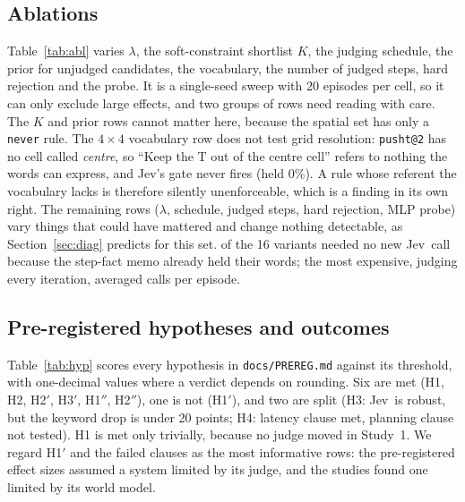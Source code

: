 \documentclass[11pt]{article}
\newcommand{\jev}{Jev}
\newcommand{\gentable}[1]{{\small\begin{adjustbox}{max width=\linewidth}\end{adjustbox}}}
\begin{document}
\subsection{Ablations}
\begin{table}[t]\centering\caption{Exploratory ablations (\jev, spatial set, Study~1 starts, seed 0,  episodes each; 95\% bootstrap intervals). $\dagger$: inert by construction on this set, which has no soft constraint. Each such row is identical to the same run without the change (the $K$ and prior rows to one another, $K=32,\lambda=4$ to $\lambda=4$); they are kept because they were pre-registered.}\label{tab:abl}
\gentable{figures/table_ablations.tex}
\end{table}
Table~\ref{tab:abl} varies $\lambda$, the soft-constraint shortlist $K$, the judging schedule, the prior for unjudged candidates, the vocabulary, the number of judged steps, hard rejection and the probe. It is a single-seed sweep with 20 episodes per cell, so it can only exclude large effects, and two groups of rows need reading with care. The $K$ and prior rows cannot matter here, because the spatial set has only a \texttt{never} rule. The $4\times4$ vocabulary row does not test grid resolution: \texttt{pusht@2} has no cell called \emph{centre}, so ``Keep the T out of the centre cell'' refers to nothing the words can express, and \jev's gate never fires (held 0\%). A rule whose referent the vocabulary lacks is therefore silently unenforceable, which is a finding in its own right. The remaining rows ($\lambda$, schedule, judged steps, hard rejection, MLP probe) vary things that could have mattered and change nothing detectable, as Section~\ref{sec:diag} predicts for this set.  of the 16 variants needed no new \jev\ call because the step-fact memo already held their words; the most expensive, judging every iteration, averaged  calls per episode.

\subsection{Pre-registered hypotheses and outcomes}\label{sec:hyp}
Table~\ref{tab:hyp} scores every hypothesis in \texttt{docs/PREREG.md} against its threshold, with one-decimal values where a verdict depends on rounding. Six are met (H1, H2, H2$'$, H3$'$, H1$''$, H2$''$), one is not (H1$'$), and two are split (H3: \jev\ is robust, but the keyword drop is under 20 points; H4: latency clause met, planning clause not tested). H1 is met only trivially, because no judge moved in Study~1. We regard H1$'$ and the failed clauses as the most informative rows: the pre-registered effect sizes assumed a system limited by its judge, and the studies found one limited by its world model.
\end{document}
